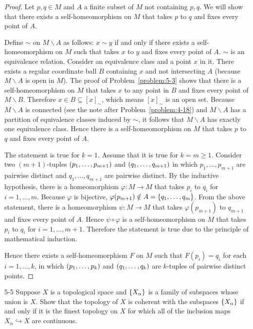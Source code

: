 \begin{proof}
	Let $p, q\in M$ and $A$ a finite subset of $M$ not containing $p, q$. We will show that there exists a self-homeomorphism on $M$ that takes $p$ to $q$ and fixes every point of $A$.

	Define $\sim$ on $M\smallsetminus A$ as follows: $x \sim y$ if and only if there exists a self-homeomorphism on $M$ such that takes $x$ to $y$ and fixes every point of $A$. $\sim$ is an equivalence relation. Consider an equivalence class and a point $x$ in it. There exists a regular coordinate ball $B$ containing $x$ and not intersecting $A$ (because $M\smallsetminus A$ is open in $M$). The proof of Problem~\ref{problem:5-3} shows that there is a self-homeomorphism on $M$ that takes $x$ to any point in $B$ and fixes every point of $M\smallsetminus B$. Therefore $x \in B \subseteq {[x]}_{\sim}$, which means ${[x]}_{\sim}$ is an open set. Because $M\smallsetminus A$ is connected (see the note after Problem~\ref{problem:4-18}) and $M\smallsetminus A$ has a partition of equivalence classes induced by $\sim$, it follows that $M\smallsetminus A$ has exactly one equivalence class. Hence there is a self-homeomorphism on $M$ that takes $p$ to $q$ and fixes every point of $A$.

	The statement is true for $k = 1$. Assume that it is true for $k = m \geq 1$. Consider two $(m+1)$-tuples $\left({p_{1}, \ldots, p_{m+1}}\right)$ and $\left({q_{1}, \ldots, q_{m+1}}\right)$ in which $p_{1}, \ldots, p_{m+1}$ are pairwise distinct and $q_{1}, \ldots, q_{m+1}$ are pairwise distinct. By the inductive hypothesis, there is a homeomorphism $\varphi: M\to M$ that takes $p_{i}$ to $q_{i}$ for $i = 1, \ldots, m$. Because $\varphi$ is bijective, $\varphi(p_{m+1}) \notin A = \left\{{ q_{1}, \ldots, q_{m} }\right\}$. From the above statement, there is a homeomorphism $\psi: M\to M$ that takes $\varphi(p_{m+1})$ to $q_{m+1}$ and fixes every point of $A$. Hence $\psi\circ\varphi$ is a self-homeomorphism on $M$ that takes $p_{i}$ to $q_{i}$ for $i = 1, \ldots, m+1$. Therefore the statement is true due to the principle of mathematical induction.

	Hence there exists a self-homeomorphism $F$ on $M$ such that $F(p_{i}) = q_{i}$ for each $i = 1, \ldots, k$, in which $\left({p_{1}, \ldots, p_{k}}\right)$ and $\left({q_{1}, \ldots, q_{k}}\right)$ are $k$-tuples of pairwise distinct points.
\end{proof}

\begin{problem}{5-5}\label{problem:5-5}
Suppose $X$ is a topological space and $\left\{{X_{\alpha}}\right\}$ is a family of subspaces whose union is $X$. Show that the topology of $X$ is coherent with the subspaces $\left\{{X_{\alpha}}\right\}$ if and only if it is the finest topology on $X$ for which all of the inclusion maps $X_{\alpha} \hookrightarrow{} X$ are continuous.
\end{problem}

